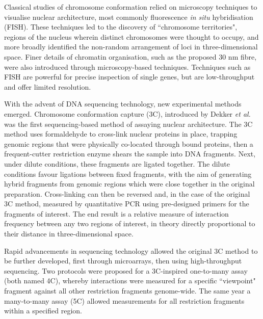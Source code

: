 \documentclass[a4paper,11pt,oneside]{book}
\begin{document}
Classical studies of chromosome conformation relied on microscopy techniques to visualise nuclear architecture, most commonly fluorescence \emph{in situ} hybridisation (FISH). These techniques led to the discovery of ``chromosome territories", regions of the nucleus wherein distinct chromosomes were thought to occupy, and more broadly identified the non-random arrangement of loci in three-dimensional space.\cite{DeWit2012, VanSteensel2010} Finer details of chromatin organisation, such as the proposed 30 nm fibre, were also introduced through microscopy-based techniques. Techniques such as FISH are powerful for precise inspection of single genes, but are low-throughput and offer limited resolution.\cite{DeWit2012}

With the advent of DNA sequencing technology, new experimental methods emerged. Chromosome conformation capture (3C), introduced by Dekker \emph{et al.}\cite{Dekker2002} was the first sequencing-based method of assaying nuclear architecture. The 3C method uses formaldehyde to cross-link nuclear proteins in place, trapping genomic regions that were physically co-located through bound proteins, then a frequent-cutter restriction enzyme shears the sample into DNA fragments. Next, under dilute conditions, these fragments are ligated together. The dilute conditions favour ligations between fixed fragments, with the aim of generating hybrid fragments from genomic regions which were close together in the original preparation. Cross-linking can then be reversed and, in the case of the original 3C method, measured by quantitative PCR using pre-designed primers for the fragments of interest. The end result is a relative measure of interaction frequency between any two regions of interest, in theory directly proportional to their distance in three-dimensional space.

Rapid advancements in sequencing technology allowed the original 3C method to be further developed, first through microarrays, then using high-throughput sequencing. Two protocols were proposed for a 3C-inspired one-to-many assay\cite{Zhao2006, Simonis2006} (both named 4C), whereby interactions were measured for a specific ``viewpoint" fragment against all other restriction fragments genome-wide. The same year a many-to-many assay (5C) allowed measurements for all restriction fragments within a specified region.\cite{Dostie2006} 
\end{document}
